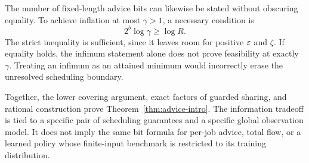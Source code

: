 The number of fixed-length advice bits can likewise be stated without obscuring equality. To achieve inflation at most $\gamma>1$, a necessary condition is
\begin{equation}\label{eq:bits-necessary}
 2^b\log\gamma\geq\log R.
\end{equation}
The strict inequality is sufficient, since it leaves room for positive $\varepsilon$ and $\zeta$. If equality holds, the infimum statement alone does not prove feasibility at exactly $\gamma$. Treating an infimum as an attained minimum would incorrectly erase the unresolved scheduling boundary.

Together, the lower covering argument, exact factors of guarded sharing, and rational construction prove Theorem~\ref{thm:advice-intro}. The information tradeoff is tied to a specific pair of scheduling guarantees and a specific global observation model. It does not imply the same bit formula for per-job advice, total flow, or a learned policy whose finite-input benchmark is restricted to its training distribution.

